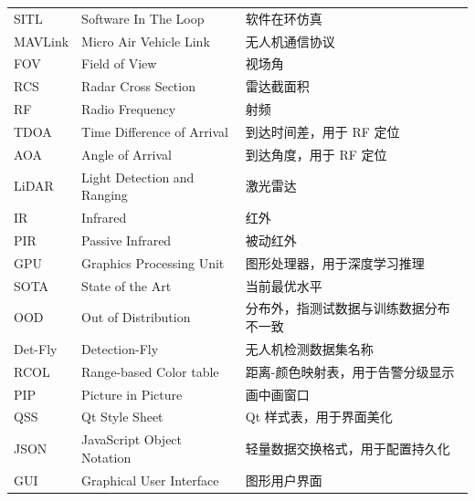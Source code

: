\documentclass[12pt, a4paper]{ctexart}
\begin{document}
\begin{table}[H]
\begin{tabular}{p{2.5cm}p{4cm}p{7cm}}
SITL & Software In The Loop & 软件在环仿真 \\
MAVLink & Micro Air Vehicle Link & 无人机通信协议 \\
FOV & Field of View & 视场角 \\
RCS & Radar Cross Section & 雷达截面积 \\
RF & Radio Frequency & 射频 \\
TDOA & Time Difference of Arrival & 到达时间差，用于 RF 定位 \\
AOA & Angle of Arrival & 到达角度，用于 RF 定位 \\
LiDAR & Light Detection and Ranging & 激光雷达 \\
IR & Infrared & 红外 \\
PIR & Passive Infrared & 被动红外 \\
GPU & Graphics Processing Unit & 图形处理器，用于深度学习推理 \\
SOTA & State of the Art & 当前最优水平 \\
OOD & Out of Distribution & 分布外，指测试数据与训练数据分布不一致 \\
Det-Fly & Detection-Fly & 无人机检测数据集名称 \\
RCOL & Range-based Color table & 距离-颜色映射表，用于告警分级显示 \\
PIP & Picture in Picture & 画中画窗口 \\
QSS & Qt Style Sheet & Qt 样式表，用于界面美化 \\
JSON & JavaScript Object Notation & 轻量数据交换格式，用于配置持久化 \\
GUI & Graphical User Interface & 图形用户界面 \\
\bottomrule
\end{tabular}
\end{table}
\end{document}
